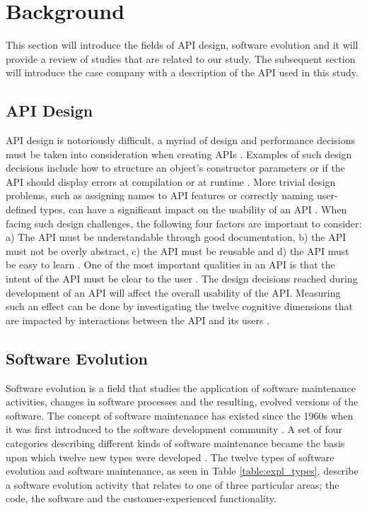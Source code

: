 \documentclass{sig-alternate}
\begin{document}
\section{Background} \label{background}
This section will introduce the fields of API design, software evolution and it will provide a review of studies that are related to our study. The subsequent section will introduce the case company with a description of the API used in this study.  

\subsection{API Design} \label{api_design}

API design is notoriously difficult, a myriad of design and performance decisions must be taken into consideration when creating APIs \cite{afonso2012evaluating, bloch2008effective, stylos2006comparing}. Examples of such design decisions include how to structure an object's constructor parameters or if the API should display errors at compilation or at runtime \cite{stylos2006comparing}. More trivial design problems, such as assigning names to API features or correctly naming user-defined types, can have a significant impact on the usability of an API \cite{shi2011empirical}. When facing such design challenges, the following four factors are important to consider: a) The API must be understandable through good documentation, b) the API must not be overly abstract, c) the API must be reusable and d) the API must be easy to learn \cite{shi2011empirical}. One of the most important qualities in an API is that the intent of the API must be clear to the user \cite{shi2011empirical, stylos2006comparing}. The design decisions reached during development of an API will affect the overall usability of the API. Measuring such an effect can be done by investigating the twelve cognitive dimensions that are impacted by interactions between the API and its users \cite{clarke2004measuring}. 


\subsection{Software Evolution} \label{software_evolution}
Software evolution is a field that studies the application of software maintenance activities, changes in software processes and the resulting, evolved versions of the software. The concept of software maintenance has existed since the 1960s when it was first introduced to the software development community \cite{lientz1980software}. A set of four categories describing different kinds of software maintenance \cite{lientz1980software} became the basis upon which twelve new types were developed \cite{chapin2001types}. The twelve types of software evolution and software maintenance, as seen in Table \ref{table:expl_types}, describe a software evolution activity that relates to one of three particular areas; the code, the software and the customer-experienced functionality. 
\end{document}
